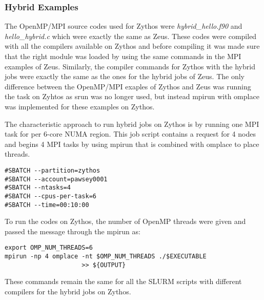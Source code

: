 \subsubsection{Hybrid Examples}

The OpenMP/MPI source codes used for Zythos were \emph{hybrid\_hello.f90} and \emph{hello\_hybrid.c} which were exactly the same as Zeus. These codes 
were compiled with all the compilers available on Zythos and before compiling it was made sure that the right module was loaded by using the same 
commands in the MPI examples of Zeus. Similarly, the compiler commands for Zythos with the hybrid jobs were exactly the same as the ones for the hybrid 
jobs of Zeus. The only difference between the OpenMP/MPI exaples of Zythos and Zeus was running the task on Zyhtos as srun was no longer used, but 
instead mpirun with omplace was implemented for these examples on Zythos. 

The characteristic approach to run hybrid jobs on Zythos is by running one MPI task for per 6-core NUMA region. This job script contains a request for 4
nodes and begins 4 MPI tasks by using mpirun that is combined with omplace to place threads.

\begin{tcolorbox}
\begin{Verbatim}[fontsize=\scriptsize]
#SBATCH --partition=zythos
#SBATCH --account=pawsey0001
#SBATCH --ntasks=4
#SBATCH --cpus-per-task=6
#SBATCH --time=00:10:00
\end{Verbatim}
\end{tcolorbox}

To run the codes on Zythos, the number of OpenMP threads were given and passed the message through the mpirun as:

\begin{tcolorbox}
\begin{Verbatim}[fontsize=\scriptsize]
export OMP_NUM_THREADS=6
mpirun -np 4 omplace -nt $OMP_NUM_THREADS ./$EXECUTABLE
					 >> ${OUTPUT}
\end{Verbatim}
\end{tcolorbox}

These commands remain the same for all the SLURM scripts with different compilers for the hybrid jobs on Zythos.


